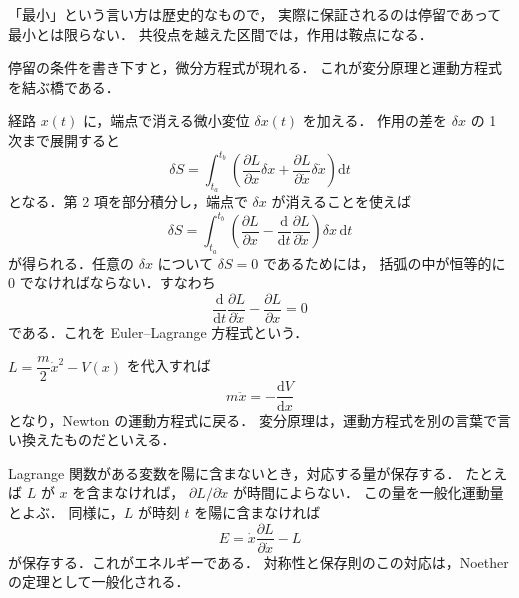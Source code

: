 \documentclass[lualatex,paper=b5j,fontsize=10pt,twoside]{jlreq}
\begin{document}
\begin{mkremark}
「最小」という言い方は歴史的なもので，
実際に保証されるのは停留であって最小とは限らない．
共役点を越えた区間では，作用は鞍点になる．
\end{mkremark}


停留の条件を書き下すと，微分方程式が現れる．
これが変分原理と運動方程式を結ぶ橋である．


経路 $x(t)$ に，端点で消える微小変位 $\delta x(t)$ を加える．
作用の差を $\delta x$ の 1 次まで展開すると
\begin{equation}
  \delta S=\int_{t_a}^{t_b}
    \left(\dfrac{\partial L}{\partial x}\delta x
      +\dfrac{\partial L}{\partial\dot{x}}\delta\dot{x}\right)\mathrm{d}t
\end{equation}
となる．第 2 項を部分積分し，端点で $\delta x$ が消えることを使えば
\begin{equation}
  \delta S=\int_{t_a}^{t_b}
    \left(\dfrac{\partial L}{\partial x}
      -\dfrac{\mathrm{d}}{\mathrm{d}t}
       \dfrac{\partial L}{\partial\dot{x}}\right)\delta x\,\mathrm{d}t
\end{equation}
が得られる．任意の $\delta x$ について $\delta S=0$ であるためには，
括弧の中が恒等的に 0 でなければならない．すなわち
\begin{equation}
  \dfrac{\mathrm{d}}{\mathrm{d}t}
    \dfrac{\partial L}{\partial\dot{x}}
    -\dfrac{\partial L}{\partial x}=0
\end{equation}
である．これを Euler--Lagrange 方程式という．

$L=\dfrac{m}{2}\dot{x}^2-V(x)$ を代入すれば
\begin{equation}
  m\ddot{x}=-\dfrac{\mathrm{d}V}{\mathrm{d}x}
\end{equation}
となり，Newton の運動方程式に戻る．
変分原理は，運動方程式を別の言葉で言い換えたものだといえる．


Lagrange 関数がある変数を陽に含まないとき，対応する量が保存する．
たとえば $L$ が $x$ を含まなければ，
$\partial L/\partial\dot{x}$ が時間によらない．
この量を一般化運動量とよぶ．
同様に，$L$ が時刻 $t$ を陽に含まなければ
\begin{equation}
  E=\dot{x}\dfrac{\partial L}{\partial\dot{x}}-L
\end{equation}
が保存する．これがエネルギーである．
対称性と保存則のこの対応は，Noether の定理として一般化される．
\end{document}
